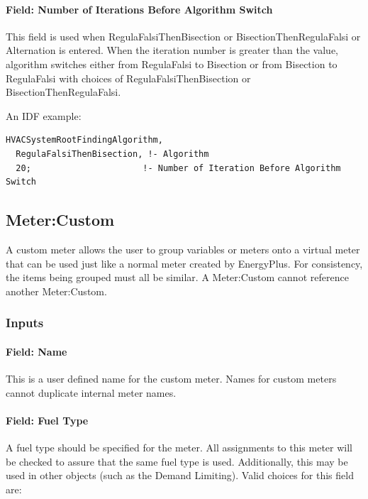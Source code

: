 \paragraph{Field: Number of Iterations Before Algorithm Switch}\label{field-number-of-iteration-before-algorithm-switch}

This field is used when RegulaFalsiThenBisection or BisectionThenRegulaFalsi or Alternation is entered. When the iteration number is greater than the value, algorithm switches either from RegulaFalsi to Bisection or from Bisection to RegulaFalsi with choices of RegulaFalsiThenBisection or BisectionThenRegulaFalsi.

An IDF example:

\begin{lstlisting}
HVACSystemRootFindingAlgorithm,
  RegulaFalsiThenBisection, !- Algorithm
  20;                      !- Number of Iteration Before Algorithm Switch
\end{lstlisting}

\subsection{Meter:Custom}\label{metercustom}

A custom meter allows the user to group variables or meters onto a virtual meter that can be used just like a normal meter created by EnergyPlus. For consistency, the items being grouped must all be similar. A Meter:Custom cannot reference another Meter:Custom.

\subsubsection{Inputs}\label{inputs-17-008}

\paragraph{Field: Name}\label{field-name-043}

This is a user defined name for the custom meter. Names for custom meters cannot duplicate internal meter names.

\paragraph{Field: Fuel Type}\label{field-fuel-type-004}

A fuel type should be specified for the meter. All assignments to this meter will be checked to assure that the same fuel type is used. Additionally, this may be used in other objects (such as the Demand Limiting). Valid choices for this field are:

